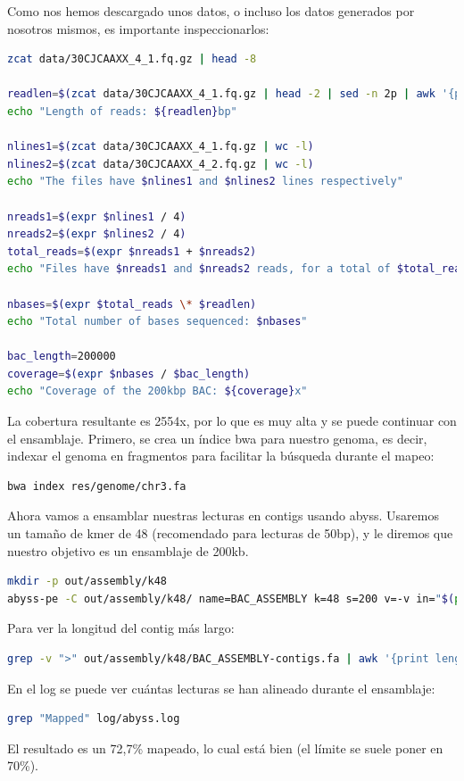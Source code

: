 Como nos hemos descargado unos datos, o incluso los datos generados por nosotros mismos, es importante inspeccionarlos: 
\begin{lstlisting}[language=bash]
zcat data/30CJCAAXX_4_1.fq.gz | head -8

readlen=$(zcat data/30CJCAAXX_4_1.fq.gz | head -2 | sed -n 2p | awk '{print length}')
echo "Length of reads: ${readlen}bp"

nlines1=$(zcat data/30CJCAAXX_4_1.fq.gz | wc -l)
nlines2=$(zcat data/30CJCAAXX_4_2.fq.gz | wc -l)
echo "The files have $nlines1 and $nlines2 lines respectively"

nreads1=$(expr $nlines1 / 4)
nreads2=$(expr $nlines2 / 4)
total_reads=$(expr $nreads1 + $nreads2)
echo "Files have $nreads1 and $nreads2 reads, for a total of $total_reads"

nbases=$(expr $total_reads \* $readlen)
echo "Total number of bases sequenced: $nbases"

bac_length=200000
coverage=$(expr $nbases / $bac_length)
echo "Coverage of the 200kbp BAC: ${coverage}x"
\end{lstlisting}

La cobertura resultante es 2554x, por lo que es muy alta y se puede continuar con el ensamblaje. Primero, se crea un índice bwa para nuestro genoma, es decir, indexar el genoma en fragmentos para facilitar la búsqueda durante el mapeo:
\begin{lstlisting}[language=bash]
bwa index res/genome/chr3.fa
\end{lstlisting}

Ahora vamos a ensamblar nuestras lecturas en contigs usando abyss.
Usaremos un tamaño de kmer de 48 (recomendado para lecturas de 50bp), y le diremos que nuestro objetivo es un ensamblaje de 200kb.
\begin{lstlisting}[language=bash]
mkdir -p out/assembly/k48
abyss-pe -C out/assembly/k48/ name=BAC_ASSEMBLY k=48 s=200 v=-v in="$(pwd)/data/30CJCAAXX_4_1.fq.gz $(pwd)/data/30CJCAAXX_4_2.fq.gz" contigs 2>&1 | tee log/abyss.log
\end{lstlisting}

Para ver la longitud del contig más largo:
\begin{lstlisting}[language=bash]
grep -v ">" out/assembly/k48/BAC_ASSEMBLY-contigs.fa | awk '{print length}' | sort -n | tail -1
\end{lstlisting}

En el log se puede ver cuántas lecturas se han alineado durante el ensamblaje:
\begin{lstlisting}[language=bash]
grep "Mapped" log/abyss.log
\end{lstlisting}
El resultado es un 72,7\% mapeado, lo cual está bien (el límite se suele poner en 70\%).